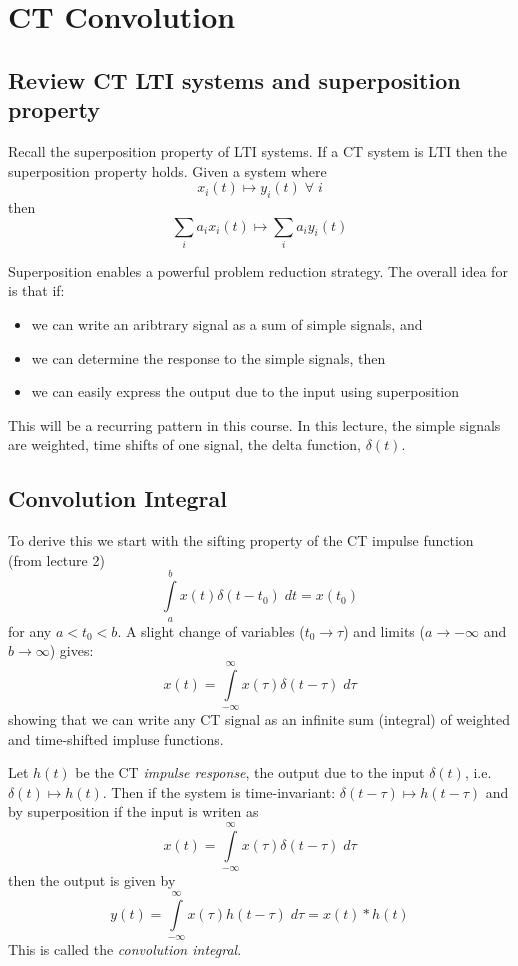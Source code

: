 \chapter{CT Convolution}

\section{Review CT LTI systems and superposition property}

Recall the superposition property of LTI systems. If a CT system is LTI then the superposition property holds. Given a system where
\[   
x_i(t) \mapsto y_i(t) \; \forall\; i
\]
then
\[
\sum\limits_{i} a_i x_i(t) \mapsto \sum\limits_{i} a_i y_i(t) 
\]

Superposition enables a powerful problem reduction strategy. The overall idea for is that if:

\begin{itemize}
\item we can write an aribtrary signal as a sum of simple signals, and 
\item we can determine the response to the simple signals, then
\item we can easily express the output due to the input using superposition
\end{itemize}

This will be a recurring pattern in this course. In this lecture, the simple signals are weighted, time shifts of one signal, the delta function, $\delta(t)$.

\section{Convolution Integral}

To derive this we start with the sifting property of the CT impulse function (from lecture 2)
\[
\int\limits_{a}^{b} x(t)\delta(t-t_0) \; dt = x(t_0)
\]
for any $a < t_0 < b$. A slight change of variables ($t_0 \rightarrow \tau$) and limits ($a \rightarrow -\infty$ and $b \rightarrow \infty$) gives:
\[
x(t) = \int\limits_{-\infty}^{\infty} x(\tau)\delta(t-\tau) \; d\tau
\]
showing that we can write any CT signal as an infinite sum (integral) of weighted and time-shifted impluse functions.

Let $h(t)$ be the CT {\it impulse response}, the output due to the input $\delta(t)$, i.e. $\delta(t) \mapsto h(t)$. Then if the system is time-invariant: $\delta(t-\tau) \mapsto h(t-\tau)$ and by superposition if the input is writen as
\[
x(t) = \int\limits_{-\infty}^{\infty} x(\tau)\delta(t-\tau) \; d\tau
\]
then the output is given by
\[
  y(t) = \int\limits_{-\infty}^{\infty} x(\tau)h(t-\tau) \; d\tau = x(t) * h(t)
\]
This is called the \emph{convolution integral}.

